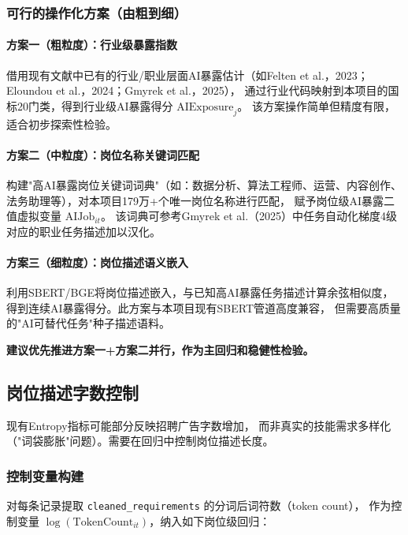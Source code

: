 \documentclass[12pt,a4paper]{ctexart}
\begin{document}
\subsubsection{可行的操作化方案（由粗到细）}

\paragraph{方案一（粗粒度）：行业级暴露指数}

借用现有文献中已有的行业/职业层面AI暴露估计（如Felten et al.，2023；
Eloundou et al.，2024；Gmyrek et al.，2025），
通过行业代码映射到本项目的国标20门类，得到行业级AI暴露得分 $\text{AIExposure}_{j}$。
该方案操作简单但精度有限，适合初步探索性检验。

\paragraph{方案二（中粒度）：岗位名称关键词匹配}

构建"高AI暴露岗位关键词词典"（如：数据分析、算法工程师、运营、内容创作、
法务助理等），对本项目179万+个唯一岗位名称进行匹配，
赋予岗位级AI暴露二值虚拟变量 $\text{AIJob}_{it}$。
该词典可参考Gmyrek et al.（2025）中任务自动化梯度4级对应的职业任务描述加以汉化。

\paragraph{方案三（细粒度）：岗位描述语义嵌入}

利用SBERT/BGE将岗位描述嵌入，与已知高AI暴露任务描述计算余弦相似度，
得到连续AI暴露得分。此方案与本项目现有SBERT管道高度兼容，
但需要高质量的"AI可替代任务"种子描述语料。

\textbf{建议优先推进方案一+方案二并行，作为主回归和稳健性检验。}

\subsection{岗位描述字数控制}
\label{sec:plan_wordcount}

现有Entropy指标可能部分反映招聘广告字数增加，
而非真实的技能需求多样化（"词袋膨胀"问题）。需要在回归中控制岗位描述长度。

\subsubsection{控制变量构建}

对每条记录提取 \texttt{cleaned\_requirements} 的分词后词符数（token count），
作为控制变量 $\log(\text{TokenCount}_{it})$，纳入如下岗位级回归：
\end{document}

